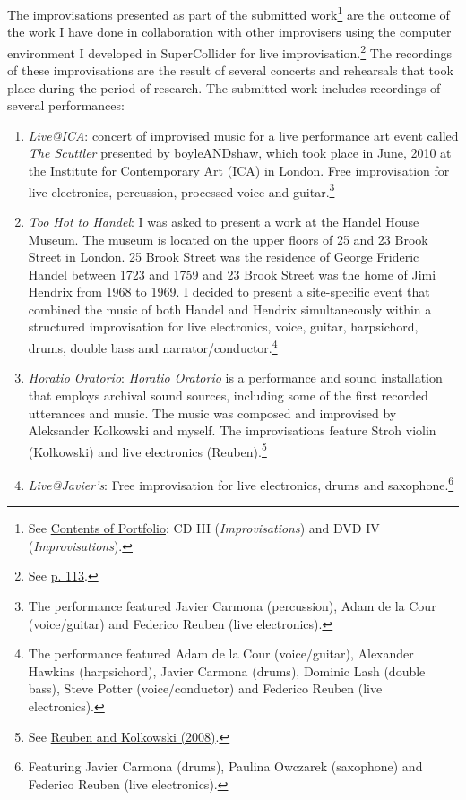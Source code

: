 The improvisations presented as part of the submitted work\footnote{See \hyperlink{portfolio}{Contents of Portfolio}: CD III (\emph{Improvisations}) and DVD IV (\emph{Improvisations}).} are the outcome of the work I have done in collaboration with other improvisers using the computer environment I developed in SuperCollider for live improvisation.\footnote{See \hyperlink{improvprog}{p. 113}.} The recordings of these improvisations are the result of several concerts and rehearsals that took place during the period of research. The submitted work includes recordings of several performances:
\begin{enumerate} 
\item \emph{Live@ICA}: concert of improvised music for a live performance art event called \emph{The Scuttler} presented by boyleANDshaw, which took place in June, 2010 at the Institute for Contemporary Art (ICA) in London. Free improvisation for live electronics, percussion, processed voice and guitar.\footnote{The performance featured Javier Carmona (percussion), Adam de la Cour (voice/guitar) and Federico Reuben (live electronics).}
\item \emph{Too Hot to Handel}: I was asked to present a work at the Handel House Museum. The museum is located on the upper floors of 25 and 23 Brook Street in London. 25 Brook Street was the residence of George Frideric Handel between 1723 and 1759 and 23 Brook Street was the home of Jimi Hendrix from 1968 to 1969. I decided to present a site-specific event that combined the music of both Handel and Hendrix simultaneously within a structured improvisation for live electronics, voice, guitar, harpsichord, drums, double bass and narrator/conductor.\footnote{The performance featured Adam de la Cour (voice/guitar), Alexander Hawkins (harpsichord), Javier Carmona (drums), Dominic Lash (double bass), Steve Potter (voice/conductor) and Federico Reuben (live electronics).}
\item \emph{Horatio Oratorio}: \emph{Horatio Oratorio} is a performance and sound installation that employs archival sound sources, including some of the first recorded utterances and music. The music was composed and improvised by Aleksander Kolkowski and myself. The improvisations feature Stroh violin (Kolkowski) and live electronics (Reuben).\footnote{See \hyperlink{reuben}{Reuben and Kolkowski (2008)}.}
\item \emph{Live@Javier's}: Free improvisation for live electronics, drums and saxophone.\footnote{Featuring Javier Carmona (drums), Paulina Owczarek (saxophone) and Federico Reuben (live electronics).}

\end{enumerate}
